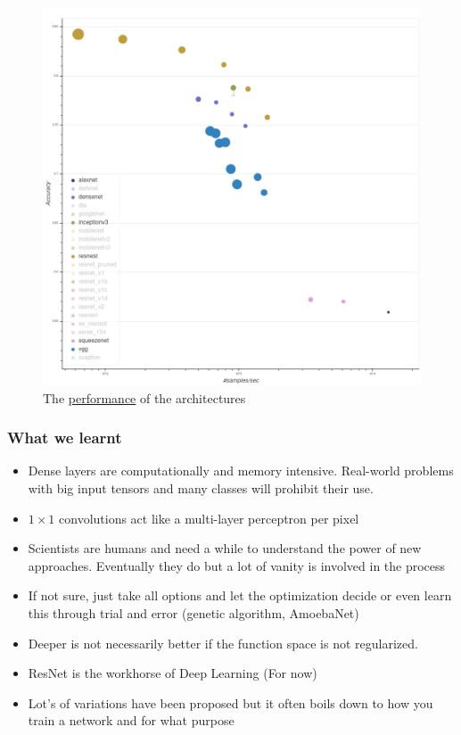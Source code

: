 \documentclass[11pt]{article}
\begin{document}
\begin{figure}[H]
    \centering
    \includegraphics[trim={0 0 0 0},clip,width=.7\linewidth]{figures/bokeh_plot.png}
    \caption{The \href{https://cv.gluon.ai/model_zoo/classification.html}{performance} of the architectures} \label{fig:architecture-comparison}
\end{figure}

\subsubsection{What we learnt}

\begin{itemize}
    \item Dense layers are computationally and memory intensive. Real-world problems with big input tensors and many classes will prohibit their use.
    \item $1\times 1$ convolutions act like a multi-layer perceptron per pixel
    \item Scientists are humans and need a while to understand the power of new approaches. Eventually they do but a lot of vanity is involved in the process
    \item If not sure, just take all options and let the optimization decide or even learn this through trial and error (genetic algorithm, AmoebaNet)
    \item Deeper is not necessarily better if the function space is not regularized.
    \item ResNet is the workhorse of Deep Learning (For now) 
    \item Lot's of variations have been proposed but it often boils down to how you train a network and for what purpose
\end{itemize}
\end{document}
